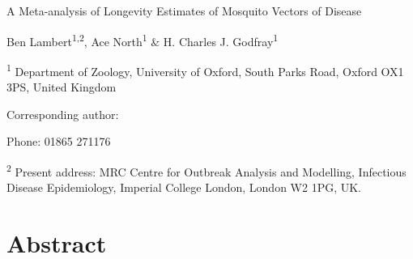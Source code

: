 \documentclass[]{article}
\date{}
\begin{document}
A Meta-analysis of Longevity Estimates of Mosquito Vectors of Disease

Ben Lambert\textsuperscript{1,2}, Ace North\textsuperscript{1} \& H.
Charles J. Godfray\textsuperscript{1}

\textsuperscript{1} Department of Zoology, University of Oxford, South
Parks Road, Oxford OX1 3PS, United Kingdom

Corresponding author:

Phone: 01865 271176

\textsuperscript{2} Present address: MRC Centre for Outbreak Analysis
and Modelling, Infectious Disease Epidemiology, Imperial College London,
London W2 1PG, UK.


\section{Abstract}\label{abstract}
\end{document}
